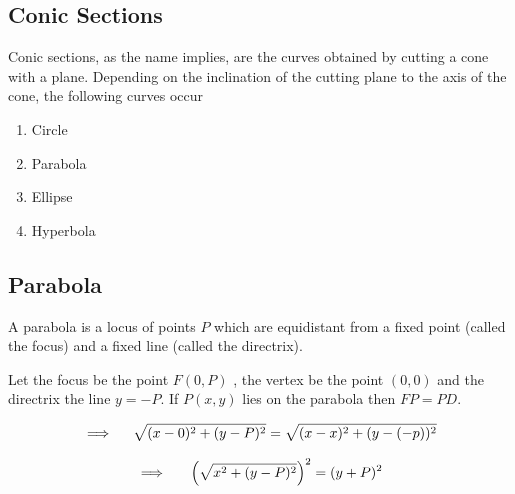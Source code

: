 \documentclass[11pt,a4paper]{article}
\theoremstyle{definition}
\begin{document}
\subsection{Conic Sections}
Conic sections, as the name implies, are the curves obtained by cutting a cone with a plane. Depending on the inclination of the cutting plane to the axis of the cone, the following curves occur

\begin{enumerate}
\item Circle 
\item Parabola
\item Ellipse
\item Hyperbola
\end{enumerate}

\subsection{Parabola}
A parabola is a locus of points $P$ which are equidistant from a fixed point (called the focus) and a fixed line (called the directrix).


\begin{figure}[H]
\centering
{}
\end{figure}

Let the focus be the point $F(0,P)$ , the vertex be the point $(0,0)$ and the directrix the line $y = -P$. If $P(x,y)$ lies on the parabola then $FP = PD$.

$$\implies \hspace{0.4cm} \sqrt{(x- 0)^2 + (y  - P)^2}  = \sqrt{(x - x)^2 + (y-(-p))^2}$$

$$\implies \hspace{0.5cm} \Big(\sqrt{x^2 + (y - P)^2}\Big)^2 = (y+P)^2$$
\end{document}
